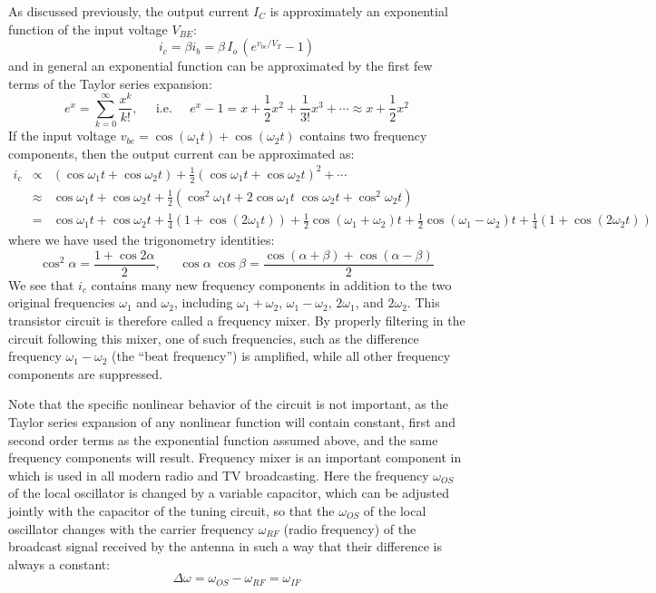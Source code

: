\documentclass{article}
\begin{document}
\begin{itemize}
As discussed previously, the output current $I_C$ is approximately an 
exponential function of the input voltage $V_{BE}$:
\begin{equation}
  i_c=\beta i_b=\beta\, I_o\, (e^{v_{be}/V_T}-1) 
\end{equation}
and in general an exponential function can be approximated by the first
few terms of the Taylor series expansion:
\begin{equation}
  e^x=\sum_{k=0}^\infty \frac{x^k}{k!},\;\;\;\;\;\mbox{i.e.}\;\;\;\;\;
  e^x-1=x+\frac{1}{2} x^2+\frac{1}{3!} x^3+\cdots
  \approx x+\frac{1}{2} x^2 
\end{equation}
If the input voltage $v_{be}=\cos(\omega_1t)+\cos(\omega_2t)$ contains 
two frequency components, then the output current can be approximated as:
\begin{eqnarray} 
  i_c &\propto& (\cos\omega_1t+\cos\omega_2t) +\frac{1}{2}(\cos\omega_1t+\cos\omega_2t)^2 
  +\cdots 
  \nonumber \\
  &\approx &\cos\omega_1t+\cos\omega_2t+\frac{1}{2}\left(\cos^2\omega_1t+2\cos\omega_1t\;\cos\omega_2t +\cos^2\omega_2t\right) 
  \nonumber \\
  &=&\cos\omega_1t+\cos\omega_2t
  +\frac{1}{4}(1+\cos(2\omega_1t))
  +\frac{1}{2}\cos(\omega_1+\omega_2)t  +\frac{1}{2}\cos(\omega_1-\omega_2)t
  +\frac{1}{4}(1+\cos(2\omega_2t))
\end{eqnarray}
where we have used the trigonometry identities:
\begin{equation} 
\cos^2\alpha=\frac{1+\cos 2\alpha}{2},\;\;\;\;\;
\cos\alpha\;\cos\beta=\frac{\cos(\alpha+\beta)+\cos(\alpha-\beta)}{2} 
\end{equation}
We see that $i_c$ contains many new frequency components in addition 
to the two original frequencies $\omega_1$ and $\omega_2$, including 
$\omega_1+\omega_2$, $\omega_1-\omega_2$, $2\omega_1$, and $2\omega_2$. 
This transistor circuit is therefore called a frequency mixer. By properly 
filtering in the circuit following this mixer, one of such frequencies, 
such as the difference frequency $\omega_1-\omega_2$ (the ``beat frequency'') 
is amplified, while all other frequency components are suppressed. 

Note that the specific nonlinear behavior of the circuit is not important, 
as the Taylor series expansion of any nonlinear function will contain constant,
first and second order terms as the exponential function assumed above, and 
the same frequency components will result. Frequency mixer is an important 
component in 
which is used in all modern radio and TV broadcasting. Here the frequency 
$\omega_{OS}$ of the local oscillator is changed by a variable capacitor,
which can be adjusted jointly with the capacitor of the tuning circuit, so 
that the $\omega_{OS}$ of the local oscillator changes with the carrier 
frequency $\omega_{RF}$ (radio frequency) of the broadcast signal received
by the antenna in such a way that their difference is always a constant:
\begin{equation}
\Delta\omega=\omega_{OS}-\omega_{RF}=\omega_{IF}
\end{equation}


\end{itemize}
\end{document}
